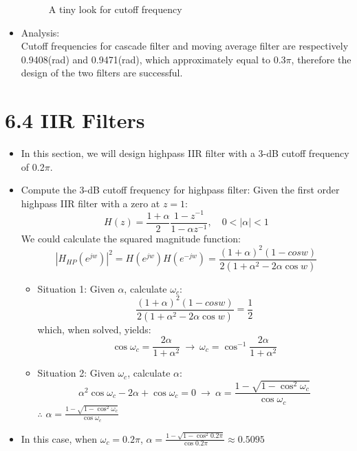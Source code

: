 \documentclass[onecolumn,oneside]{SUSTechHomework}
\begin{document}
\begin{itemize}
\begin{figure}[H]
    \caption{A tiny look for cutoff frequency}
    \end{figure}
    \item Analysis:\\ 
    Cutoff frequencies for cascade filter and moving average filter are respectively 0.9408(rad) and 0.9471(rad), which approximately equal
    to $0.3\pi$, therefore the design of the two filters are successful.

\end{itemize}
\section*{6.4 IIR Filters}
\begin{info}
\begin{itemize}
    \item In this section, we will design highpass IIR filter with a 3-dB cutoff frequency of 0.2$\pi$.
    \item Compute the 3-dB cutoff frequency for highpass filter:
    Given the first order highpass IIR filter with a zero at $z = 1$:
    $$
    H(z)=\frac{1+\alpha}{2} \frac{1-z^{-1}}{1-\alpha z^{-1}}, \quad 0<|\alpha|<1
    $$
    We could calculate the squared magnitude function:
    $$
    \left|H_{HP}\left(e^{j w}\right)\right|^{2}
    =H\left(e^{j w}\right) H\left(e^{-j w}\right)
    =\frac{(1+\alpha)^{2}(1-c o s w)}{2\left(1+\alpha^{2}-2 \alpha \cos w\right)}
    $$
    \begin{itemize}
        \item Situation 1: Given $\alpha$, calculate $\omega_c$:
        $$
        \frac{(1+\alpha)^{2}(1-c o s w)}{2\left(1+\alpha^{2}-2 \alpha \cos w\right)}=\frac{1}{2}
        $$
        which, when solved, yields:
        $$
        \cos \omega_{c}=\frac{2 \alpha}{1+\alpha^{2}}\ \rightarrow \ \omega_c=\cos^{-1}\frac{2\alpha}{1+\alpha^2}
        $$
        \item  Situation 2: Given $\omega_c$, calculate $\alpha$:
        $$
        \alpha^{2} \cos \omega_c-2 \alpha+\cos \omega_c=0\ \rightarrow \ \alpha=\frac{1-\sqrt{1-\cos^{2} \omega_c}}{\cos \omega_c} 
        $$
        $\therefore$ $\alpha=\frac{1-\sqrt{1-\cos^{2} \omega_c}}{\cos \omega_c}$
    \end{itemize}
    \item In this case, when $\omega_c=0.2\pi$, $\alpha = \frac{1-\sqrt{1-\cos^{2} 0.2\pi}}{\cos 0.2\pi}\approx 0.5095$
\end{itemize}
\end{info}
\end{document}
